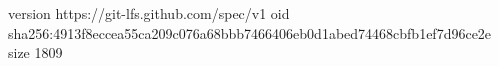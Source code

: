version https://git-lfs.github.com/spec/v1
oid sha256:4913f8eccea55ca209c076a68bbb7466406eb0d1abed74468cbfb1ef7d96ce2e
size 1809
